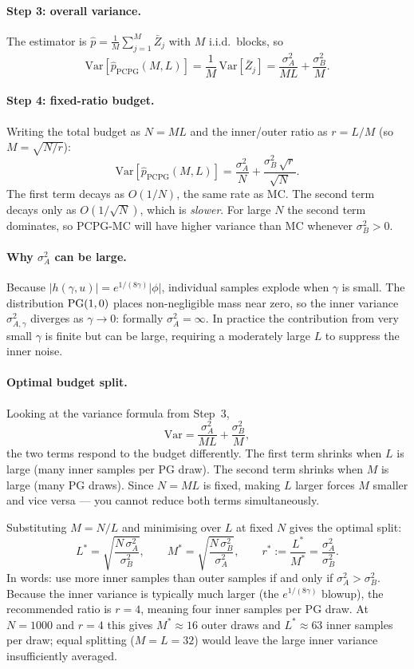 \paragraph{Step 3: overall variance.}
The estimator is $\widehat p = \frac{1}{M}\sum_{j=1}^{M}\bar Z_j$ with $M$ i.i.d.\ blocks, so
\[
  \mathrm{Var}\!\left[\widehat{p}_{\mathrm{PCPG}}(M,L)\right]
  = \frac{1}{M}\,\mathrm{Var}[\bar Z_j]
  = \frac{\sigma^2_A}{ML} + \frac{\sigma^2_B}{M}.
\]

\paragraph{Step 4: fixed-ratio budget.}
Writing the total budget as $N = ML$ and the inner/outer ratio as $r = L/M$
(so $M = \sqrt{N/r}$):
\[
  \mathrm{Var}\!\left[\widehat{p}_{\mathrm{PCPG}}(M,L)\right]
  = \frac{\sigma^2_A}{N} + \frac{\sigma^2_B\,\sqrt{r}}{\sqrt{N}}.
\]
The first term decays as $O(1/N)$, the same rate as MC.
The second term decays only as $O(1/\sqrt{N})$, which is \emph{slower}.
For large $N$ the second term dominates, so PCPG-MC will have higher variance
than MC whenever $\sigma^2_B > 0$.

\paragraph{Why $\sigma^2_A$ can be large.}
Because $|h(\gamma,u)| = e^{1/(8\gamma)}|\phi|$, individual samples explode when $\gamma$
is small.  The distribution $\mathrm{PG}(1,0)$ places non-negligible mass near zero, so the
inner variance $\sigma^2_{A,\gamma}$ diverges as $\gamma \to 0$: formally $\sigma^2_A = \infty$.
In practice the contribution from very small $\gamma$ is finite but can be large,
requiring a moderately large $L$ to suppress the inner noise.

\paragraph{Optimal budget split.}
Looking at the variance formula from Step~3,
\[
  \mathrm{Var} = \frac{\sigma^2_A}{ML} + \frac{\sigma^2_B}{M},
\]
the two terms respond to the budget differently.
The first term shrinks when $L$ is large (many inner samples per PG draw).
The second term shrinks when $M$ is large (many PG draws).
Since $N = ML$ is fixed, making $L$ larger forces $M$ smaller and vice versa ---
you cannot reduce both terms simultaneously.

Substituting $M = N/L$ and minimising over $L$ at fixed $N$ gives the optimal split:
\[
  L^* = \sqrt{\frac{N\,\sigma^2_A}{\sigma^2_B}},
  \qquad
  M^* = \sqrt{\frac{N\,\sigma^2_B}{\sigma^2_A}},
  \qquad
  r^* := \frac{L^*}{M^*} = \frac{\sigma^2_A}{\sigma^2_B}.
\]
In words: use more inner samples than outer samples if and only if $\sigma^2_A > \sigma^2_B$.
Because the inner variance is typically much larger (the $e^{1/(8\gamma)}$ blowup), the
recommended ratio is $r = 4$, meaning four inner samples per PG draw.
At $N = 1000$ and $r = 4$ this gives $M^* \approx 16$ outer draws and $L^* \approx 63$
inner samples per draw; equal splitting ($M = L = 32$) would leave the large inner
variance insufficiently averaged.

